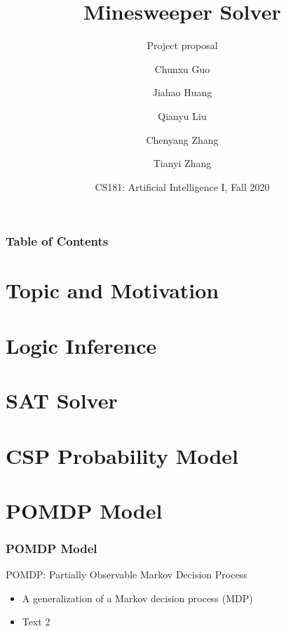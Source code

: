 \documentclass{beamer}
\title[Minesweeper Solver] %
{Minesweeper Solver}
\subtitle{Project proposal}
\author[Team 4] %
{Chunxu Guo \and Jiahao Huang \and Qianyu Liu\\ \and Chenyang Zhang \and Tianyi Zhang}
\institute[ShanghaiTech] %
{
  ShanghaiTech University
}
\date[Dec. 14] %
{CS181: Artificial Intelligence I, Fall 2020}
\begin{document}
\frame{\titlepage}


\begin{frame}
\frametitle{Table of Contents}
\tableofcontents
\end{frame}


\section{Topic and Motivation}






\section{Logic Inference}






\section{SAT Solver}






\section{CSP Probability Model}






\section{POMDP Model}

\begin{frame}
\frametitle{POMDP Model}
POMDP: Partially Observable Markov Decision Process

\begin{itemize}
    \item A generalization of a Markov decision process (MDP)
    \item Text 2
\end{itemize}
\end{frame}
\end{document}
